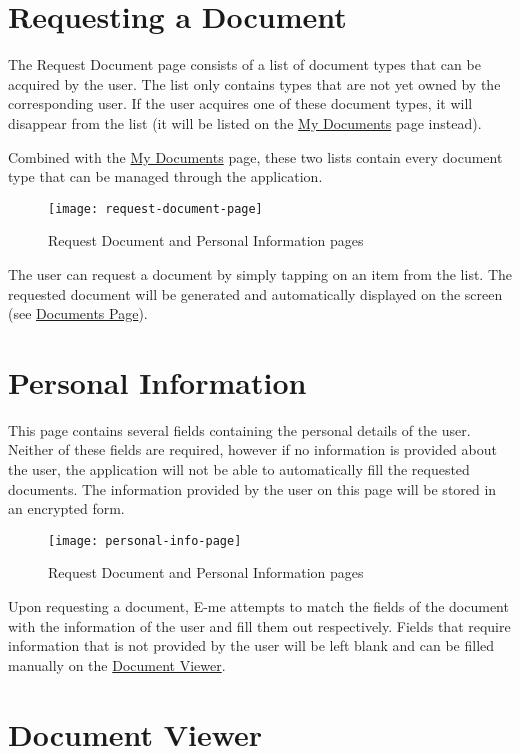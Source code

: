 	\section{Requesting a Document}

	The Request Document page consists of a list of document types that can be acquired by the user.
	The list only contains types that are not yet owned by the corresponding user.
	If the user acquires one of these document types, it will disappear from the list (it will be listed on the \hyperref[documents]{My Documents} page instead).

	Combined with the \hyperref[documents]{My Documents} page, these two lists contain every document type that can be managed through the application. 
		\begin{figure}[H]
			\centering
			\texttt{[image: request-document-page]}				
			\caption{Request Document and Personal Information pages}
		\end{figure}

		The user can request a document by simply tapping on an item from the list. 
		The requested document will be generated and automatically displayed on the screen (see \hyperref[document]{Documents Page}).

	\section{Personal Information}

	This page contains several fields containing the personal details of the user. 
	Neither of these fields are required, however if no information is provided about the user, the application will not be able to automatically fill the requested documents.
	The information provided by the user on this page will be stored in an encrypted form.
		
	\begin{figure}[H]
		\centering
		\texttt{[image: personal-info-page]}
		\caption{Request Document and Personal Information pages}
	\end{figure}

	Upon requesting a document, E-me attempts to match the fields of the document with the information of the user and fill them out respectively.
	Fields that require information that is not provided by the user will be left blank and can be filled manually on the \hyperref[document]{Document Viewer}.

	\section{Document Viewer}\label{document}

